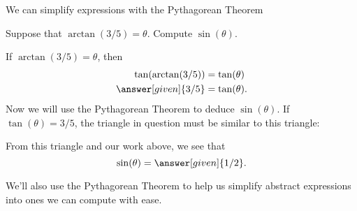 \documentclass{ximera}
\begin{document}
We can simplify expressions with the Pythagorean Theorem

\begin{example}
  Suppose that $\arctan(3/5) = \theta$. Compute $\sin(\theta)$.
  \begin{explanation}
    If $\arctan(3/5) = \theta$, then
    \begin{align*}
    \tan(\arctan(3/5)) &= \tan(\theta)\\
    \answer[given]{3/5} &= \tan(\theta).
    \end{align*}
    Now we will use the Pythagorean Theorem to deduce
    $\sin(\theta)$. If $\tan(\theta)=3/5$, the triangle in question must
    be similar to this triangle:
    \begin{image}
    \end{image}
    From this triangle and our work above, we see that
    \[
    \sin(\theta) = \answer[given]{1/2}.
    \]
  \end{explanation}
\end{example}



We'll also use the Pythagorean Theorem to help us simplify abstract
expressions into ones we can compute with ease.
\end{document}
